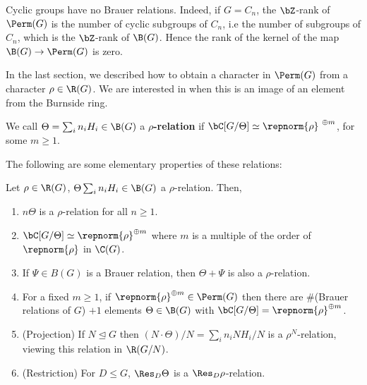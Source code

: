 \begin{example}\label{cyclic-no-brauer}
Cyclic groups have no Brauer relations. Indeed, if $G = C_n$, the $\bZ$-rank of $\Perm(G)$ is the number of cyclic subgroups of $C_n$, i.e the number of subgroups of $C_n$, which is the $\bZ$-rank of $\B(G)$. Hence the rank of the kernel of the map $\B(G) \to \Perm(G)$ is zero.
\end{example}

In the last section, we described how to obtain a character in $\Perm(G)$ from a character $\rho \in \R(G)$. We are interested in when this is an image of an element from the Burnside ring.

\begin{defn}
We call $\Theta = \sum_i n_i H_i \in \B(G)$ a \textbf{$\rho$-relation} if $\bC[G / \Theta] \simeq \repnorm{\rho}^{\ \oplus m}$, for some $m \geq 1$.
\end{defn}

The following are some elementary properties of these relations:

\begin{prop} Let $\rho \in \R(G)$, $\Theta  \sum_i n_i H_i \in \B(G)$ a $\rho$-relation. Then,
    \begin{enumerate}
        \item $n \Theta$ is a $\rho$-relation for all $n \geq 1$.
        \item $\bC[G / \Theta] \simeq \repnorm{\rho}^{\oplus m}$ where $m$ is a multiple of the order of $\repnorm{\rho}$ in $\C(G)$.
        \item If $\Psi \in B(G)$ is a Brauer relation, then $\Theta + \Psi$ is also a $\rho$-relation. 
        \item For a fixed $m \geq 1$, if $\repnorm{\rho}^{\oplus m} \in \Perm(G)$ then there are $\#$(Brauer relations of $G$) $+ 1$ elements $\Theta \in \B(G)$ with $\bC[G / \Theta] = \repnorm{\rho}^{\oplus m}$.
        
        \item (Projection) If $N \trianglelefteq G$ then $(N \cdot \Theta) / N = \sum_i n_i N H_i / N$ is a $\rho^N$-relation, viewing this relation in $\R(G / N)$.
        \item (Restriction) For $D \leq G$, $\Res_D \Theta$ is a $\Res_D \rho$-relation.
    \end{enumerate}
\end{prop}

